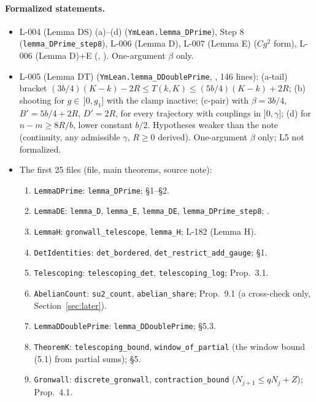 \paragraph{Formalized statements.}
\begin{itemize}
\item L-004 (Lemma DS) (a)--(d) (\texttt{YmLean.lemma\_DPrime}), Step 8 (\texttt{lemma\_DPrime\_step8}), L-006 (Lemma D), L-007 (Lemma E) ($Cg^2$ form), L-006 (Lemma D)+E (, ). One-argument $\beta$ only.
\item L-005 (Lemma DT) (\texttt{YmLean.lemma\_DDoublePrime}, , 146 lines): (a-tail) bracket $(3b/4)(K-k)-2R\le T(k,K)\le(5b/4)(K-k)+2R$; (b) shooting for $g\in\,]0,g_1]$ with the clamp inactive; (c-pair) with $\beta=3b/4$, $B'=5b/4+2R$, $D'=2R$, for every trajectory with couplings in $]0,\gamma]$; (d) for $n-m\ge8R/b$, lower constant $b/2$. Hypotheses weaker than the note (continuity, any admissible $\gamma$, $R\ge0$ derived). One-argument $\beta$ only; L5 not formalized.
\item The first 25 files (file, main theorems, source note):
\begin{enumerate}\small
\item \texttt{LemmaDPrime}: \texttt{lemma\_DPrime};  \S1--\S2.
\item \texttt{LemmaDE}: \texttt{lemma\_D}, \texttt{lemma\_E}, \texttt{lemma\_DE}, \texttt{lemma\_DPrime\_step8}; .
\item \texttt{LemmaH}: \texttt{gronwall\_telescope}, \texttt{lemma\_H};  L-182 (Lemma H).
\item \texttt{DetIdentities}: \texttt{det\_bordered}, \texttt{det\_restrict\_add\_gauge};  \S1.
\item \texttt{Telescoping}: \texttt{telescoping\_det}, \texttt{telescoping\_log};  Prop.\ 3.1.
\item \texttt{AbelianCount}: \texttt{su2\_count}, \texttt{abelian\_share};  Prop.\ 9.1 (a cross-check only, Section~\ref{sec:later}).
\item \texttt{LemmaDDoublePrime}: \texttt{lemma\_DDoublePrime};  \S5.3.
\item \texttt{TheoremK}: \texttt{telescoping\_bound}, \texttt{window\_of\_partial} (the window bound (5.1) from partial sums);  \S5.
\item \texttt{Gronwall}: \texttt{discrete\_gronwall}, \texttt{contraction\_bound} ($N_{j+1}\le qN_j+Z$);  Prop.\ 4.1.

\end{enumerate}
\end{itemize}
